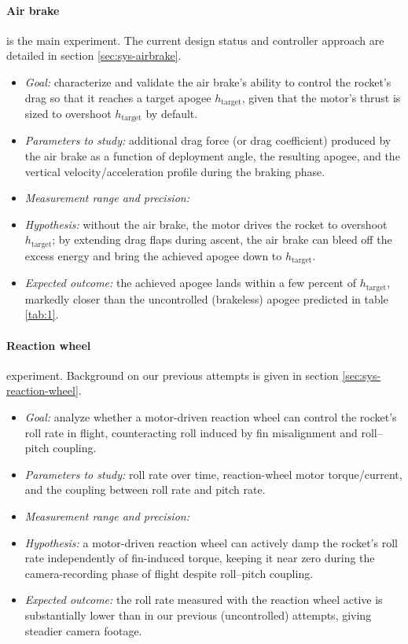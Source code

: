 \paragraph{Air brake} is the main experiment. The current design status and controller approach are detailed in section \ref{sec:sys-airbrake}.
\begin{itemize}
    \item \textit{Goal:} characterize and validate the air brake's ability to control the rocket's drag so that it reaches a target apogee $h_{\textrm{target}}$, given that the motor's thrust is sized to overshoot $h_{\textrm{target}}$ by default.
    \item \textit{Parameters to study:} additional drag force (or drag coefficient) produced by the air brake as a function of deployment angle, the resulting apogee, and the vertical velocity/acceleration profile during the braking phase.
    \item \textit{Measurement range and precision:} \todo{}
    \item \textit{Hypothesis:} without the air brake, the motor drives the rocket to overshoot $h_{\textrm{target}}$; by extending drag flaps during ascent, the air brake can bleed off the excess energy and bring the achieved apogee down to $h_{\textrm{target}}$.
    \item \textit{Expected outcome:} the achieved apogee lands within a few percent of $h_{\textrm{target}}$, markedly closer than the uncontrolled (brakeless) apogee predicted in table \ref{tab:1}.
\end{itemize}

\paragraph{Reaction wheel} experiment. Background on our previous attempts is given in section \ref{sec:sys-reaction-wheel}.
\begin{itemize}
    \item \textit{Goal:} analyze whether a motor-driven reaction wheel can control the rocket's roll rate in flight, counteracting roll induced by fin misalignment and roll--pitch coupling.
    \item \textit{Parameters to study:} roll rate over time, reaction-wheel motor torque/current, and the coupling between roll rate and pitch rate.
    \item \textit{Measurement range and precision:} \todo{}
    \item \textit{Hypothesis:} a motor-driven reaction wheel can actively damp the rocket's roll rate independently of fin-induced torque, keeping it near zero during the camera-recording phase of flight despite roll--pitch coupling.
    \item \textit{Expected outcome:} the roll rate measured with the reaction wheel active is substantially lower than in our previous (uncontrolled) attempts, giving steadier camera footage.
\end{itemize}

